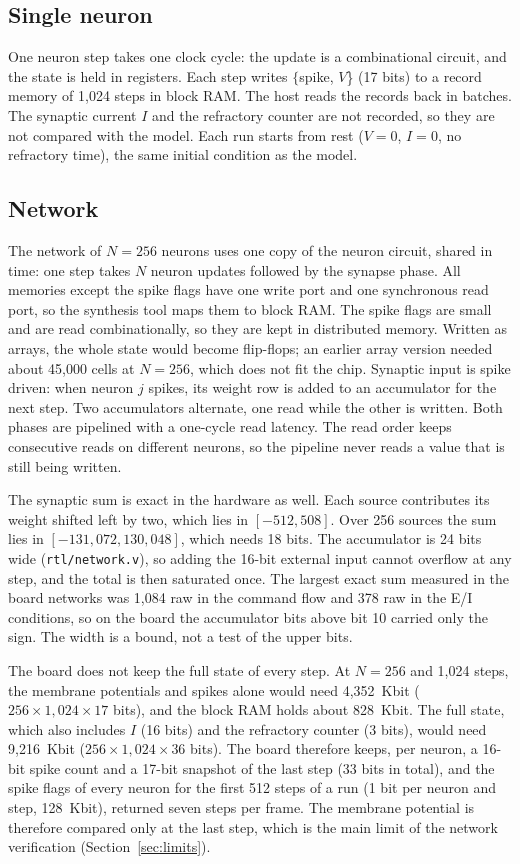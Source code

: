 \documentclass[11pt]{article}
\begin{document}
\subsection{Single neuron}
One neuron step takes one clock cycle: the update is a combinational circuit, and the state is held in registers.
Each step writes $\{$spike, $V$\} (17 bits) to a record memory of 1,024 steps in block RAM. The host reads the records back in batches. The synaptic current $I$ and the refractory counter are not recorded, so they are not compared with the model.
Each run starts from rest ($V=0$, $I=0$, no refractory time), the same initial condition as the model.

\subsection{Network}
\label{sec:network-hw}
The network of $N=256$ neurons uses one copy of the neuron circuit, shared in time: one step takes $N$ neuron updates followed by the synapse phase.
All memories except the spike flags have one write port and one synchronous read port, so the synthesis tool maps them to block RAM.
The spike flags are small and are read combinationally, so they are kept in distributed memory.
Written as arrays, the whole state would become flip-flops; an earlier array version needed about 45,000 cells at $N=256$, which does not fit the chip.
Synaptic input is spike driven: when neuron $j$ spikes, its weight row is added to an accumulator for the next step.
Two accumulators alternate, one read while the other is written.
Both phases are pipelined with a one-cycle read latency. The read order keeps consecutive reads on different neurons, so the pipeline never reads a value that is still being written.

The synaptic sum is exact in the hardware as well. Each source contributes its weight shifted left by two, which lies in $[-512, 508]$. Over 256 sources the sum lies in $[-131{,}072, 130{,}048]$, which needs 18 bits. The accumulator is 24 bits wide (\texttt{rtl/network.v}), so adding the 16-bit external input cannot overflow at any step, and the total is then saturated once. The largest exact sum measured in the board networks was 1,084 raw in the command flow and 378 raw in the E/I conditions, so on the board the accumulator bits above bit 10 carried only the sign. The width is a bound, not a test of the upper bits.

The board does not keep the full state of every step. At $N=256$ and 1,024 steps, the membrane potentials and spikes alone would need 4,352~Kbit ($256 \times 1{,}024 \times 17$ bits), and the block RAM holds about 828~Kbit. The full state, which also includes $I$ (16 bits) and the refractory counter (3 bits), would need 9,216~Kbit ($256 \times 1{,}024 \times 36$ bits).
The board therefore keeps, per neuron, a 16-bit spike count and a 17-bit snapshot of the last step (33 bits in total), and the spike flags of every neuron for the first 512 steps of a run (1 bit per neuron and step, 128~Kbit), returned seven steps per frame.
The membrane potential is therefore compared only at the last step, which is the main limit of the network verification (Section~\ref{sec:limits}).
\end{document}

